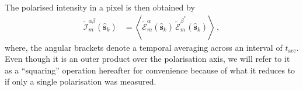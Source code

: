 \documentclass[
  journal=pasa,
  manuscript=article-type,
  year=2020,
  volume=37,
]{cup-journal}
\begin{document}
The polarised intensity in a pixel is then obtained by
\begin{align}
    \widetilde{\mathcal{I}}^{\alpha\beta}_m(\hat{\boldsymbol{s}}_k) &= \left\langle \widetilde{\mathcal{E}}_m^\alpha(\hat{\boldsymbol{s}}_k) \,  \widetilde{\mathcal{E}}_m^{\beta^*}(\hat{\boldsymbol{s}}_k) \right\rangle \, , \label{eqn:intra-station-opt-pol-img-outprod}
\end{align}
where, the angular brackets denote a temporal averaging across an interval of $t_\textrm{acc}$. Even though it is an outer product over the polarisation axis, we will refer to it as a ``squaring'' operation hereafter for convenience because of what it reduces to if only a single polarisation was measured. 



\end{document}
